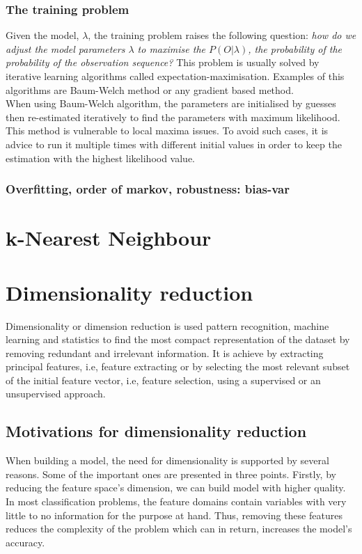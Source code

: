 \subsubsection{The training problem}
Given the model, \(\lambda\), the training problem raises the following question: \textit{how do we adjust the model parameters \(\lambda\) to maximise the \(P(O|\lambda)\), the probability of the probability of the observation sequence?}
This problem is usually solved by iterative learning algorithms called expectation-maximisation. Examples of this algorithms are Baum-Welch method or any gradient based method. %
\\When using Baum-Welch algorithm, the parameters are initialised by guesses then re-estimated iteratively to find the parameters with maximum likelihood.
This method is vulnerable to local maxima issues. To avoid such cases, it is advice to run it multiple times with different initial values in order to keep the estimation with the highest likelihood value.

\subsubsection{Overfitting, order of markov, robustness: bias-var}

\section{k-Nearest Neighbour}

\section{Dimensionality reduction}
Dimensionality or dimension reduction is used pattern recognition, machine learning and statistics to find the most compact representation of the dataset by removing redundant and irrelevant information. %
It is achieve by extracting principal features, i.e, feature extracting or by selecting the most relevant subset of the initial feature vector, i.e, feature selection, using a supervised or an unsupervised approach.

\subsection{Motivations for dimensionality reduction}
When building a model, the need for dimensionality is supported by several reasons. Some of the important ones are presented in three points.
Firstly, by reducing the feature space's dimension, we can build model with higher quality. %
In most classification problems, the feature domains contain variables with very little to no information for the purpose at hand.
Thus, removing these features reduces the complexity of the problem which can in return, increases the model's accuracy.

